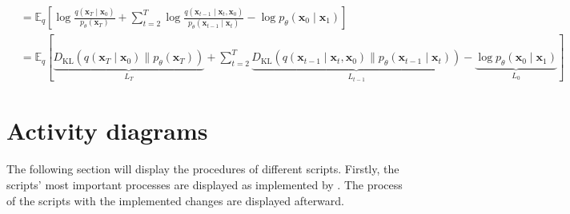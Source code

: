\begin{subequations}
\begin{align}
	& =\mathbb{E}_q\left[\log \frac{q\left(\mathbf{x}_T \mid \mathbf{x}_0\right)}{p_\theta\left(\mathbf{x}_T\right)}+\sum_{t=2}^T \log \frac{q\left(\mathbf{x}_{t-1} \mid \mathbf{x}_t, \mathbf{x}_0\right)}{p_\theta\left(\mathbf{x}_{t-1} \mid \mathbf{x}_t\right)}-\log p_\theta\left(\mathbf{x}_0 \mid \mathbf{x}_1\right)\right] \\
	& =\mathbb{E}_q[\underbrace{D_{\mathrm{KL}}\left(q\left(\mathbf{x}_T \mid \mathbf{x}_0\right) \| p_\theta\left(\mathbf{x}_T\right)\right)}_{L_T}+\sum_{t=2}^T \underbrace{D_{\mathrm{KL}}\left(q\left(\mathbf{x}_{t-1} \mid \mathbf{x}_t, \mathbf{x}_0\right) \| p_\theta\left(\mathbf{x}_{t-1} \mid \mathbf{x}_t\right)\right)}_{L_{t-1}}-\underbrace{\log p_\theta\left(\mathbf{x}_0 \mid \mathbf{x}_1\right)}_{L_0}]
	\end{align}
\end{subequations}
\endgroup

\newpage
\section{Activity diagrams}
\label{A:activity_diagrams}

The following section will display the procedures of different scripts.
Firstly, the scripts' most important processes are displayed as implemented by \cite{kotelnikov2022TabDDPMModellingTabular}. 
The process of the scripts with the implemented changes are displayed afterward.
